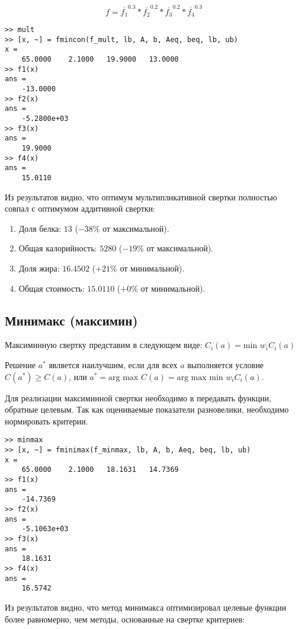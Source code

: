$$
f = \overline{f_1}^{0.3} * \overline{f_2}^{0.2} * \overline{f_3}^{0.2} * \overline{f_4}^{0.3}
$$



\begin{lstlisting}[caption=\code{Console}]
>> mult
>> [x, ~] = fmincon(f_mult, lb, A, b, Aeq, beq, lb, ub)
x =
	65.0000    2.1000   19.9000   13.0000
>> f1(x)
ans =
	-13.0000
>> f2(x)
ans =
	-5.2800e+03
>> f3(x)
ans =
	19.9000
>> f4(x)
ans =
	15.0110
\end{lstlisting}

Из результатов видно, что оптимум мультипликативной свертки полностью совпал с оптимумом аддитивной свертки:

\begin{enumerate}
	\item Доля белка: $13$ ($-38\%$ от максимальной).
	\item Общая калорийность: $5280$ ($-19\%$ от максимальной).
	\item Доля жира: $16.4502$ ($+21\%$ от минимальной).
	\item Общая стоимость: $15.0110$ ($+0\%$ от минимальной).
\end{enumerate}

\subsection{Минимакс (максимин)}

Максиминную свертку представим в следующем виде: $C_i(a)= \text{min } w_i C_i(a)$

Решение $a^*$ является наилучшим, если для всех $a$ выполняется условие $C(a^*) \geq C(a)$, или $a^* = \text{arg max } C(a) = \text{arg max min } w_i C_i (a)$.

Для реализации максиминной свертки необходимо в  передавать функции, обратные целевым. Так как оцениваемые показатели разновелики, необходимо нормировать критерии.



\begin{lstlisting}[caption=\code{Console}]
>> minmax
>> [x, ~] = fminimax(f_minmax, lb, A, b, Aeq, beq, lb, ub)
x =
	65.0000    2.1000   18.1631   14.7369
>> f1(x)
ans =
	-14.7369
>> f2(x)
ans =
	-5.1063e+03
>> f3(x)
ans =
	18.1631
>> f4(x)
ans =
	16.5742
\end{lstlisting}

Из результатов видно, что метод минимакса оптимизировал целевые функции более равномерно, чем методы, основанные на свертке критериев:

